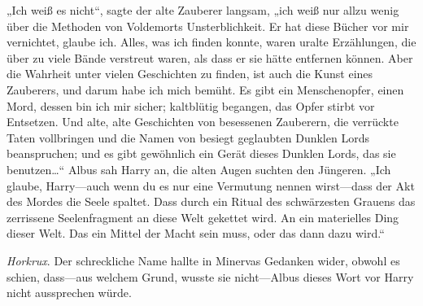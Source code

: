 „Ich weiß es nicht“, sagte der alte Zauberer langsam, „ich weiß nur allzu wenig über die Methoden von Voldemorts Unsterblichkeit. Er hat diese Bücher vor mir vernichtet, glaube ich. Alles, was ich finden konnte, waren uralte Erzählungen, die über zu viele Bände verstreut waren, als dass er sie hätte entfernen können. Aber die Wahrheit unter vielen Geschichten zu finden, ist auch die Kunst eines Zauberers, und darum habe ich mich bemüht. Es gibt ein Menschenopfer, einen Mord, dessen bin ich mir sicher; kaltblütig begangen, das Opfer stirbt vor Entsetzen. Und alte, alte Geschichten von besessenen Zauberern, die verrückte Taten vollbringen und die Namen von besiegt geglaubten Dunklen Lords beanspruchen; und es gibt gewöhnlich ein Gerät dieses Dunklen Lords, das sie benutzen…“ Albus sah Harry an, die alten Augen suchten den Jüngeren.
„Ich glaube, Harry—auch wenn du es nur eine Vermutung nennen wirst—dass der Akt des Mordes die Seele spaltet. Dass durch ein Ritual des schwärzesten Grauens das zerrissene Seelenfragment an diese Welt gekettet wird. An ein materielles Ding dieser Welt. Das ein Mittel der Macht sein muss, oder das dann dazu wird.“

\emph{Horkrux}. Der schreckliche Name hallte in Minervas Gedanken wider, obwohl es schien, dass—aus welchem Grund, wusste sie nicht—Albus dieses Wort vor Harry nicht aussprechen würde.

